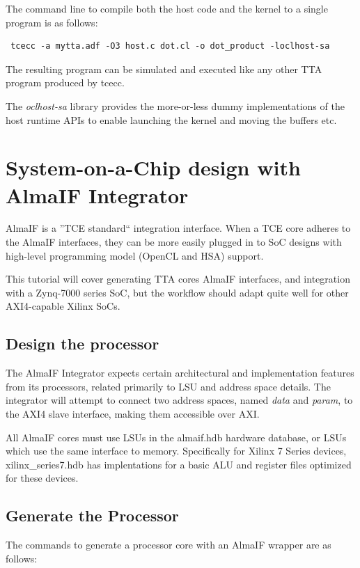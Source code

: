 \documentclass[twoside]{tceusermanual}
\begin{document}
The command line to compile both the host code and the kernel to
a single program is as follows:

\begin{verbatim}
 tcecc -a mytta.adf -O3 host.c dot.cl -o dot_product -loclhost-sa
\end{verbatim}

The resulting program can be simulated and executed like any 
other TTA program produced by tcecc.

The \textit{oclhost-sa} library provides the more-or-less dummy
implementations of the host runtime APIs to enable launching the
kernel and moving the buffers etc.

\section{System-on-a-Chip design with AlmaIF Integrator}

AlmaIF is a ''TCE standard`` integration interface. When a TCE core adheres
to the AlmaIF interfaces, they can be more easily plugged in to SoC designs with
high-level programming model (OpenCL and HSA) support.

This tutorial will cover generating TTA cores AlmaIF interfaces, and
integration with a Zynq-7000
series SoC, but the workflow should adapt quite well for other AXI4-capable
Xilinx SoCs.

\subsection{Design the processor}

The AlmaIF Integrator expects certain architectural and implementation features
from its processors, related primarily to LSU and address space details.
The integrator will attempt to connect two address spaces, named \textit{data}
and \textit{param}, to the AXI4 slave interface, making them accessible over
AXI.

All AlmaIF cores must use LSUs in the almaif.hdb hardware database, or LSUs
which use the same interface to memory. Specifically for Xilinx 7 Series
devices, xilinx\_series7.hdb has implentations for a basic ALU and register files
optimized for these devices.

\subsection{Generate the Processor}

The commands to generate a processor core with an AlmaIF wrapper are as follows:
\end{document}
